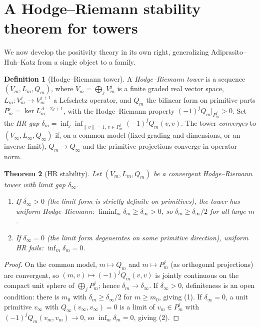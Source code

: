 \documentclass[11pt]{amsart}
\newtheorem{theorem}{Theorem}[section]
\theoremstyle{definition}
\newtheorem{definition}[theorem]{Definition}
\theoremstyle{remark}
\begin{document}
\section{A Hodge--Riemann stability theorem for towers}
We now develop the positivity theory in its own right, generalizing
Adiprasito--Huh--Katz from a single object to a family.

\begin{definition}[Hodge--Riemann tower]
A \emph{Hodge--Riemann tower} is a sequence $(V_m,L_m,Q_m)$, where $V_m=
\bigoplus_jV_m^j$ is a finite graded real vector space, $L_m\colon V_m^j\to
V_m^{j+1}$ a Lefschetz operator, and $Q_m$ the bilinear form on primitive parts
$P_m^j=\ker L_m^{\,d-2j+1}$, with the Hodge--Riemann property
$(-1)^jQ_m|_{P_m^j}>0$. Set the \emph{HR gap}
$\delta_m=\inf_{j}\inf_{\|v\|=1,\,v\in P_m^j}(-1)^jQ_m(v,v)$. The tower
\emph{converges} to $(V_\infty,L_\infty,Q_\infty)$ if, on a common model (fixed
grading and dimensions, or an inverse limit), $Q_m\to Q_\infty$ and the primitive
projections converge in operator norm.
\end{definition}

\begin{theorem}[HR stability]\label{thm:hr}
Let $(V_m,L_m,Q_m)$ be a convergent Hodge--Riemann tower with limit gap
$\delta_\infty$.
\begin{enumerate}
\item If $\delta_\infty>0$ (the limit form is strictly definite on primitives),
the tower has \emph{uniform Hodge--Riemann}: $\liminf_m\delta_m\ge\delta_\infty>0$,
so $\delta_m\ge\delta_\infty/2$ for all large $m$.
\item If $\delta_\infty=0$ (the limit form degenerates on some primitive
direction), uniform HR fails: $\inf_m\delta_m=0$.
\end{enumerate}
\end{theorem}
\begin{proof}
On the common model, $m\mapsto Q_m$ and $m\mapsto P_m^j$ (as orthogonal
projections) are convergent, so $(m,v)\mapsto(-1)^jQ_m(v,v)$ is jointly continuous
on the compact unit sphere of $\bigoplus_jP_m^j$; hence $\delta_m\to\delta_\infty$.
If $\delta_\infty>0$, definiteness is an open condition: there is $m_0$ with
$\delta_m\ge\delta_\infty/2$ for $m\ge m_0$, giving (1). If $\delta_\infty=0$, a
unit primitive $v_\infty$ with $Q_\infty(v_\infty,v_\infty)=0$ is a limit of
$v_m\in P_m^{j}$ with $(-1)^jQ_m(v_m,v_m)\to0$, so $\inf_m\delta_m=0$, giving (2).
\end{proof}
\end{document}
